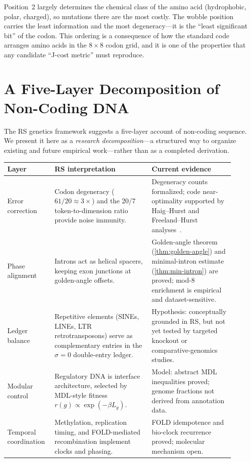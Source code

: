 \documentclass[11pt,a4paper]{article}
\begin{document}
Position~2 largely determines the chemical class of the amino acid (hydrophobic, polar, charged), so mutations there are the most costly.  The wobble position carries the least information and the most degeneracy---it is the ``least significant bit'' of the codon.  This ordering is a consequence of how the standard code arranges amino acids in the $8 \times 8$ codon grid, and it is one of the properties that any candidate ``J-cost metric'' must reproduce.

\section{A Five-Layer Decomposition of Non-Coding DNA}
\label{sec:layers}

The RS genetics framework suggests a five-layer account of non-coding sequence. We present it here as a \emph{research decomposition}---a structured way to organize existing and future empirical work---rather than as a completed derivation.

\begin{center}
\small
\renewcommand{\arraystretch}{1.3}
\begin{tabular}{@{}p{0.18\linewidth}p{0.40\linewidth}p{0.34\linewidth}@{}}
\toprule
\textbf{Layer} & \textbf{RS interpretation} & \textbf{Current evidence} \\
\midrule
Error correction & Codon degeneracy ($61/20 \approx 3\times$) and the 20/7 token-to-dimension ratio provide noise immunity. & Degeneracy counts formalized; code near-optimality supported by Haig--Hurst and Freeland--Hurst analyses~\cite{HaigHurst1991, FreelandHurst1998}. \\

Phase alignment & Introns act as helical spacers, keeping exon junctions at golden-angle offsets. & Golden-angle theorem (\cref{thm:golden-angle}) and minimal-intron estimate (\cref{thm:min-intron}) are proved; mod-8 enrichment is empirical and dataset-sensitive. \\

Ledger balance & Repetitive elements (SINEs, LINEs, LTR retrotransposons) serve as complementary entries in the $\sigma{=}0$ double-entry ledger. & Hypothesis: conceptually grounded in RS, but not yet tested by targeted knockout or comparative-genomics studies. \\

Modular control & Regulatory DNA is interface architecture, selected by MDL-style fitness $r(g) \propto \exp(-\beta L_g)$. & Model: abstract MDL inequalities proved; genome fractions not derived from annotation data. \\

Temporal coordination & Methylation, replication timing, and FOLD-mediated recombination implement clocks and phasing. & FOLD idempotence and bio-clock recurrence proved; molecular mechanism open. \\
\bottomrule
\end{tabular}
\end{center}
\end{document}
